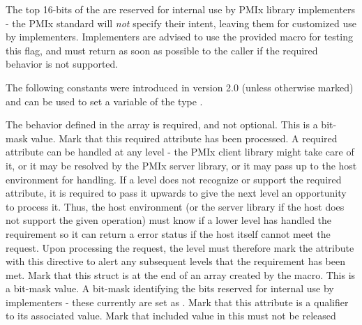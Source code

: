 \adviceimplstart
The top 16-bits of the  are reserved for internal use by \ac{PMIx} library implementers - the \ac{PMIx} standard will \textit{not} specify their intent, leaving them for customized use by implementers. Implementers are advised to use the provided  macro for testing this flag, and must return  as soon as possible to the caller if the required behavior is not supported.
\adviceimplend

The following constants were introduced in version 2.0 (unless otherwise marked) and can be used to set a variable of the type .

\begin{constantdesc}
%
The behavior defined in the  array is required, and not optional. This is a bit-mask value.
%
Mark that this required attribute has been processed. A required attribute can be handled at any level - the \ac{PMIx} client library might take care of it, or it may be resolved by the \ac{PMIx} server library, or it may pass up to the host environment for handling. If a level does not recognize or support the required attribute, it is required to pass it upwards to give the next level an opportunity to process it. Thus, the host environment (or the server library if the host does not support the given operation) must know if a lower level has handled the requirement so it can return a  error status if the host itself cannot meet the request. Upon processing the request, the level must therefore mark the attribute with this directive to alert any subsequent levels that the requirement has been met.
%
Mark that this  struct is at the end of an array created by the  macro. This is a bit-mask value.
%
A bit-mask identifying the bits reserved for internal use by implementers - these currently are set as .
%
Mark that this attribute is a qualifier to its
associated value.
%
Mark that included value in this  must not be released
%
\end{constantdesc}

